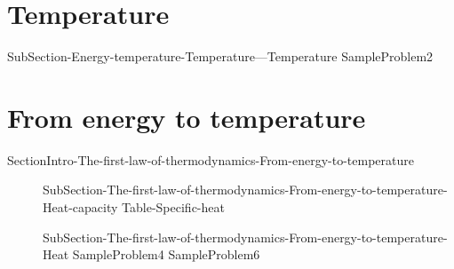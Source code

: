 \documentclass[main.tex]{subfiles}
\newcommand\chapterlabel{Ch-thermochemistry}\setcounter{figurenewcounter}{0}\setcounter{tablenewcounter}{0}\setcounter{formulanewcounter}{0}
\begin{document}
\section{Temperature}{SubSection-Energy-temperature-Temperature---Temperature}
{SampleProblem2}
 

\section{From energy  to temperature}{SectionIntro-The-first-law-of-thermodynamics-From-energy-to-temperature}
\sloppy\begin{description}
\item[] {SubSection-The-first-law-of-thermodynamics-From-energy-to-temperature-Heat-capacity}
{Table-Specific-heat}
\item[] {SubSection-The-first-law-of-thermodynamics-From-energy-to-temperature-Heat}
{SampleProblem4}
{SampleProblem6}
\end{description}
\end{document}
